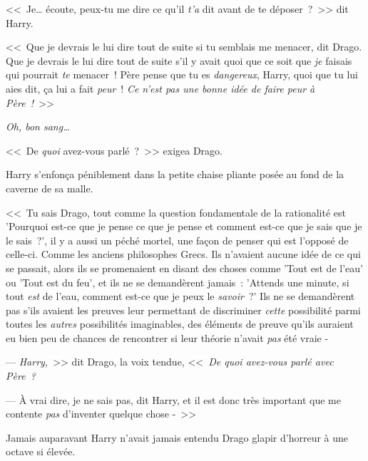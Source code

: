 <<~Je… écoute, peux-tu me dire ce qu'il \emph{t'a} dit avant de te déposer~?~>> dit Harry.

<<~Que je devrais le lui dire tout de suite si tu semblais me menacer, dit Drago. Que je devrais le lui dire tout de suite s'il y avait quoi que ce soit que \emph{je} faisais qui pourrait \emph{te} menacer~! Père pense que tu es \emph{dangereux}, Harry, quoi que tu lui aies dit, ça lui a fait \emph{peur}~! \emph{Ce n'est pas une bonne idée de faire peur à Père~!}~>>

\emph{Oh, bon sang…}

<<~De \emph{quoi} avez-vous parlé~?~>> exigea Drago.

Harry s'enfonça péniblement dans la petite chaise pliante posée au fond de la caverne de sa malle.

<<~Tu sais Drago, tout comme la question fondamentale de la rationalité est 'Pourquoi est-ce que je pense ce que je pense et comment est-ce que je sais que je le sais~?', il y a aussi un péché mortel, une façon de penser qui est l'opposé de celle-ci. Comme les anciens philosophes Grecs. Ils n'avaient aucune idée de ce qui se passait, alors ils se promenaient en disant des choses comme 'Tout est de l'eau' ou 'Tout est du feu', et ils ne se demandèrent jamais~: 'Attends une minute, si tout \emph{est} de l'eau, comment est-ce que je peux le \emph{savoir}~?' Ils ne se demandèrent pas s'ils avaient les preuves leur permettant de discriminer \emph{cette} possibilité parmi toutes les \emph{autres} possibilités imaginables, des éléments de preuve qu'ils auraient eu bien peu de chances de rencontrer si leur théorie n'avait \emph{pas} été vraie -

--- \emph{Harry,}~>> dit Drago, la voix tendue, <<~\emph{De quoi avez-vous parlé avec Père~?}

--- À vrai dire, je ne sais pas, dit Harry, et il est donc très important que me contente \emph{pas} d'inventer quelque chose -~>>

Jamais auparavant Harry n'avait jamais entendu Drago glapir d'horreur à une octave si élevée.
